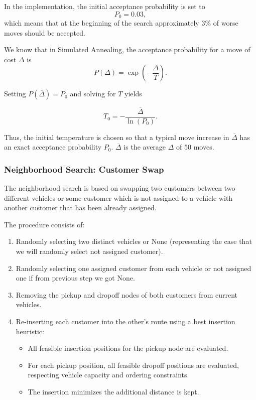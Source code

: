 \documentclass[12pt]{article}
\begin{document}
In the implementation, the initial acceptance probability is set to
\[
    P_0 = 0.03,
\]
which means that at the beginning of the search approximately \(3\%\) of worse moves
should be accepted.

We know that in Simulated Annealing, the acceptance probability for a move of cost 
$\Delta$ is
\[
    P(\Delta) = \exp\!\left(-\frac{\Delta}{T}\right).
\]

Setting $P(\overline{\Delta}) = P_0$ and solving for $T$ yields

\[
    T_0 = -\frac{\overline{\Delta}}{\ln(P_0)}.
\]

Thus, the initial temperature is chosen so that a typical move increase in
$\overline{\Delta}$ has an exact acceptance probability $P_0$. $\overline{\Delta}$ is the average ${\Delta}$ of $50$ moves.

\subsubsection{Neighborhood Search: Customer Swap}

The neighborhood search is based on swapping two customers between two
different vehicles or some customer which is not assigned to a vehicle with another customer that has been already assigned. 

The procedure consists of:

\begin{enumerate}
    \item Randomly selecting two distinct vehicles or None (representing the case that we will randomly select not assigned customer).
    \item Randomly selecting one assigned customer from each vehicle or not assigned one if from previous step we got None.
    \item Removing the pickup and dropoff nodes of both customers from current vehicles.
    \item Re-inserting each customer into the other's route using a best
          insertion heuristic:
        \begin{itemize}
            \item All feasible insertion positions for the pickup node are evaluated.
            \item For each pickup position, all feasible dropoff positions are evaluated, respecting vehicle capacity and ordering constraints.
            \item The insertion minimizes the additional distance is kept.
        \end{itemize}
\end{enumerate}
\end{document}
